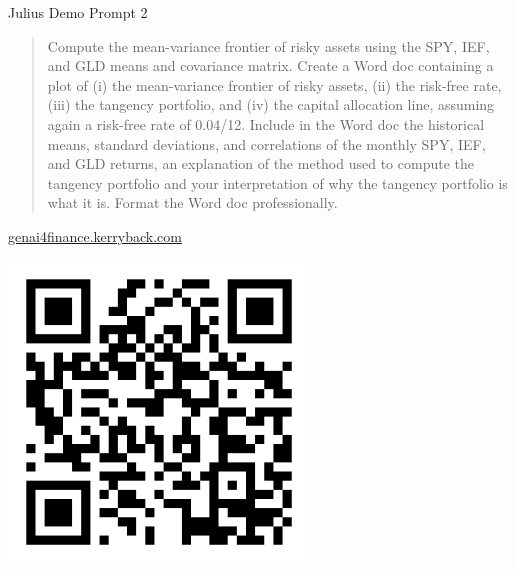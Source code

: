 \documentclass{beamer}
\begin{document}
\begin{frame}{Julius Demo Prompt 2}
   \begin{quote}
   Compute the mean-variance frontier of risky assets using the SPY, IEF, and GLD means and covariance matrix.  Create a Word doc containing a plot of (i) the mean-variance frontier of risky assets, (ii) the risk-free rate, (iii) the tangency portfolio, and (iv) the capital allocation line, assuming again a risk-free rate of 0.04/12.  Include in the Word doc the historical means, standard deviations, and correlations of the monthly SPY, IEF, and GLD returns, an explanation of the method used to compute the tangency portfolio and your interpretation of why the tangency portfolio is what it is.  Format the Word doc professionally.

   \end{quote}
\end{frame}

\begin{frame}{\href{https://genai4finance.kerryback.com}{genai4finance.kerryback.com}}
\begin{center}
\includegraphics[width=0.6\textwidth]{genai4finance_qr.png}
\end{center}
\end{frame}
\end{document}
